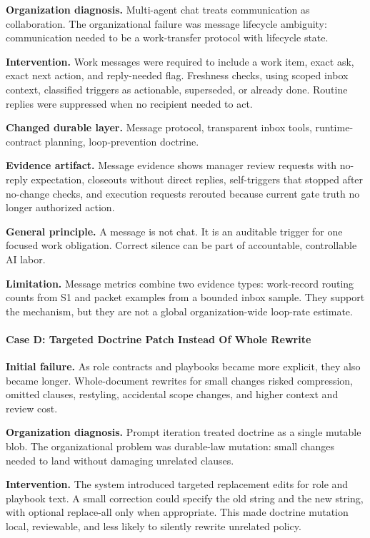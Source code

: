 \documentclass[
]{article}
\begin{document}
\textbf{Organization diagnosis.} Multi-agent chat treats communication as collaboration. The organizational failure was message lifecycle ambiguity: communication needed to be a work-transfer protocol with lifecycle state.

\textbf{Intervention.} Work messages were required to include a work item, exact ask, exact next action, and reply-needed flag. Freshness checks, using scoped inbox context, classified triggers as actionable, superseded, or already done. Routine replies were suppressed when no recipient needed to act.

\textbf{Changed durable layer.} Message protocol, transparent inbox tools, runtime-contract planning, loop-prevention doctrine.

\textbf{Evidence artifact.} Message evidence shows manager review requests with no-reply expectation, closeouts without direct replies, self-triggers that stopped after no-change checks, and execution requests rerouted because current gate truth no longer authorized action.

\textbf{General principle.} A message is not chat. It is an auditable trigger for one focused work obligation. Correct silence can be part of accountable, controllable AI labor.

\textbf{Limitation.} Message metrics combine two evidence types: work-record routing counts from S1 and packet examples from a bounded inbox sample. They support the mechanism, but they are not a global organization-wide loop-rate estimate.

\paragraph{Case D: Targeted Doctrine Patch Instead Of Whole Rewrite}\label{case-d-targeted-doctrine-patch-instead-of-whole-rewrite}

\textbf{Initial failure.} As role contracts and playbooks became more explicit, they also became longer. Whole-document rewrites for small changes risked compression, omitted clauses, restyling, accidental scope changes, and higher context and review cost.

\textbf{Organization diagnosis.} Prompt iteration treated doctrine as a single mutable blob. The organizational problem was durable-law mutation: small changes needed to land without damaging unrelated clauses.

\textbf{Intervention.} The system introduced targeted replacement edits for role and playbook text. A small correction could specify the old string and the new string, with optional replace-all only when appropriate. This made doctrine mutation local, reviewable, and less likely to silently rewrite unrelated policy.
\end{document}
